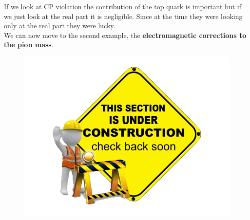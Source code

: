 \documentclass[../main.tex]{subfiles}
\begin{document}
If we look at CP violation the contribution of the top quark is important but if we just look at the real part it is negligible. Since at the time they were looking only at the real part they were lucky.\\
We can now move to the second example, the \textbf{electromagnetic corrections to the pion mass}.
\begin{figure}[h]
    \centering
    \includegraphics{Images/workinprogress.png}
    \caption*{}
    \label{fig:my_label}
\end{figure}
\end{document}
